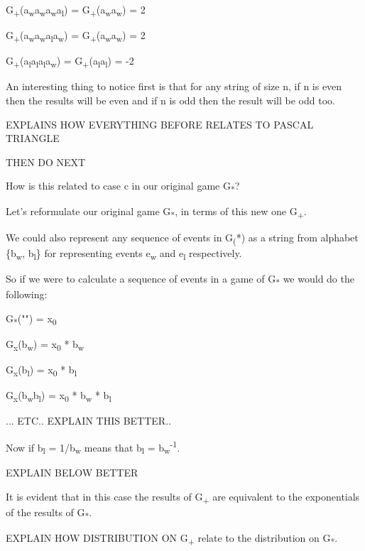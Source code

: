 \documentclass[12pt,reqno]{amsart}
\begin{document}
G\textsubscript{+}(a\textsubscript{w}a\textsubscript{w}a\textsubscript{w}a\textsubscript{l}) = G\textsubscript{+}(a\textsubscript{w}a\textsubscript{w}) =  2

G\textsubscript{+}(a\textsubscript{w}a\textsubscript{w}a\textsubscript{l}a\textsubscript{w}) = G\textsubscript{+}(a\textsubscript{w}a\textsubscript{w}) = 2

G\textsubscript{+}(a\textsubscript{l}a\textsubscript{l}a\textsubscript{l}a\textsubscript{w}) = G\textsubscript{+}(a\textsubscript{l}a\textsubscript{l}) = -2

An interesting thing to notice first is that for any string of size n, if n is even then the results will be even and if n is odd then the result will be odd too.

EXPLAINS HOW EVERYTHING BEFORE RELATES TO PASCAL TRIANGLE

THEN DO NEXT


How is this related to case c in our original game G\textsubscript{*}?


Let's reformulate our original game G\textsubscript{*},  in terms of this new one G\textsubscript{+}.

We could also represent any sequence of events in G\textsubscript(*) as a string from alphabet \{b\textsubscript{w}, b\textsubscript{l}\} for representing events e\textsubscript{w} and e\textsubscript{l} respectively.

So if we were to calculate a sequence of events in a game of G\textsubscript{*} we would do the following:

G\textsubscript{*}("") = x\textsubscript{0}

G\textsubscript{x}(b\textsubscript{w}) = x\textsubscript{0} * b\textsubscript{w}

G\textsubscript{x}(b\textsubscript{l}) = x\textsubscript{0} * b\textsubscript{l}

G\textsubscript{x}(b\textsubscript{w}b\textsubscript{l}) = x\textsubscript{0} * b\textsubscript{w} * b\textsubscript{l}

... ETC.. EXPLAIN THIS BETTER..

Now if b\textsubscript{l} = 1/b\textsubscript{w} means that b\textsubscript{l} = b\textsubscript{w}\textsuperscript{-1}.

EXPLAIN BELOW BETTER

It is evident that in this case the results of G\textsubscript{+} are equivalent to the exponentials of the results of G\textsubscript{*}.

EXPLAIN HOW DISTRIBUTION ON G\textsubscript{+} relate to the distribution on G\textsubscript{*}.
\end{document}
